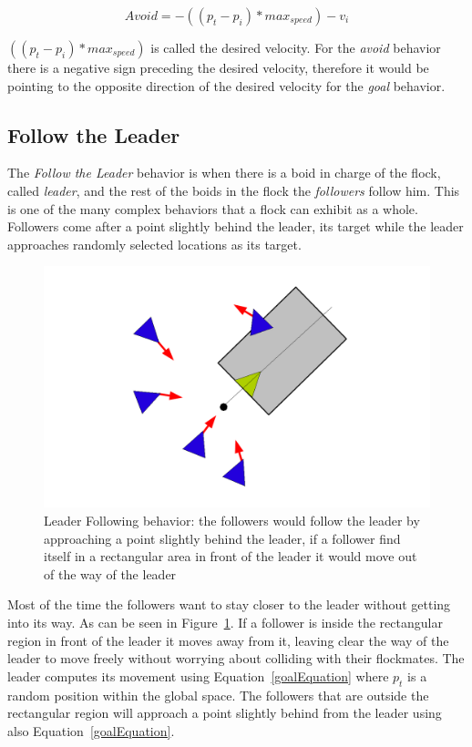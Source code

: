 \begin{equation}
\label{avoidEquation}
Avoid = -((p_t - p_i) * max_{speed}) - v_i
\end{equation}

$((p_t - p_i) * max_{speed})$ is called the desired velocity. For the \textit{avoid} behavior there is a negative sign preceding the desired velocity, therefore it would be pointing to the opposite direction of the desired velocity for the \textit{goal} behavior.

\subsection{Follow the Leader}
The \textit{Follow the Leader} behavior is when there is a boid in charge of the flock, called \textit{leader}, and the rest of the boids in the flock the \textit{followers} follow him. This is one of the many complex behaviors that a flock can exhibit as a whole. Followers come after a point slightly behind the leader, its target while the leader approaches randomly selected locations as its target.

\begin{figure}[htbp]
\begin{center}
\includegraphics[scale=0.5]{figures/leaderFollowing.pdf}
\caption{Leader Following behavior: the followers would follow the leader by approaching a point slightly behind the leader, if a follower find itself in a rectangular area in front of the leader it would move out of the way of the leader}
\label{leaderPDF}
\end{center}
\end{figure}

Most of the time the followers want to stay closer to the leader without getting into its way. As can be seen in Figure~\ref{leaderPDF}.  If a follower is inside the rectangular region in front of the leader it moves away from it, leaving clear the way of the leader to move freely without worrying about colliding with their flockmates. The leader computes its movement using Equation~\ref{goalEquation} where $p_t$ is a random position within the global space. The followers that are outside the rectangular region will approach a point slightly behind from the leader using also Equation~\ref{goalEquation}.


